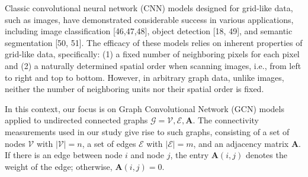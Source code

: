 \documentclass{cys}
\begin{document}






Classic convolutional neural network (CNN) models designed for grid-like data, such as images, have demonstrated considerable success in various applications, including image classification [46,47,48], object detection [18, 49], and semantic segmentation [50, 51]. The efficacy of these models relies on inherent properties of grid-like data, specifically: (1) a fixed number of neighboring pixels for each pixel and (2) a naturally determined spatial order when scanning images, i.e., from left to right and top to bottom. However, in arbitrary graph data, unlike images, neither the number of neighboring units nor their spatial order is fixed.

\bigskip
In this context, our focus is on Graph Convolutional Network (GCN) models applied to undirected connected graphs $\mathcal{G}={\mathcal{V},\mathcal{E},\mathbf{A}}$. The connectivity measurements used in our study give rise to such graphs, consisting of a set of nodes $\mathcal{V}$ with $|\mathcal{V}| = n$, a set of edges $\mathcal{E}$ with $|\mathcal{E}| = m$, and an adjacency matrix $\mathbf{A}$. If there is an edge between node $i$ and node $j$, the entry $\mathbf{A}(i,j)$ denotes the weight of the edge; otherwise, $\mathbf{A}(i,j) = 0$.
\end{document}

